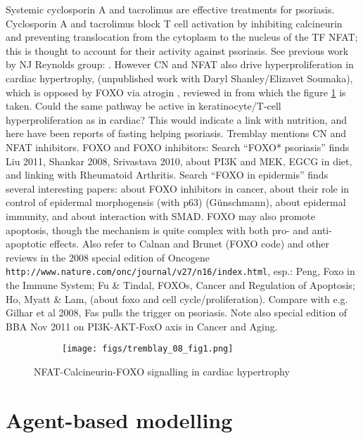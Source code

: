 \documentclass[a4paper,10pt]{report}
\begin{document}
Systemic cyclosporin A and tacrolimus are effective treatments for psoriasis. Cyclosporin A and tacrolimus block T cell activation by inhibiting calcineurin and preventing translocation from the cytoplasm to the nucleus of the TF NFAT; this is thought to account for their activity against psoriasis. See previous work by NJ Reynolds group: \cite{aldaraji2002localization}. However CN and NFAT also drive hyperproliferation in cardiac hypertrophy, (unpublished work with Daryl Shanley/Elizavet Soumaka), which is opposed by FOXO via atrogin \cite{ni2006foxo, ni2007foxo, li2007atrogin}, reviewed in \cite{tremblay2008phosphatases} from which the figure \ref{fig:tremblayfoxonfat} is taken. Could the same pathway be active in keratinocyte/T-cell hyperproliferation as in cardiac? This would indicate a link with nutrition, and here have been reports of fasting helping psoriasis. Tremblay mentions CN and NFAT inhibitors. FOXO and FOXO inhibitors: Search ``FOXO* psoriasis'' finds Liu 2011, Shankar 2008, Srivastava 2010, about PI3K and MEK, EGCG in diet, and linking with Rheumatoid Arthritis. Search ``FOXO in epidermis'' finds several interesting papers: about FOXO inhibitors in cancer, about their role in control of epidermal morphogensis (with p63) (G\"{u}nschmann), about epidermal immunity, and about interaction with SMAD. FOXO may also promote apoptosis, though the mechanism is quite complex with both pro- and anti- apoptotic effects. Also refer to Calnan and Brunet (FOXO code) and other reviews in the 2008 special edition of Oncogene {\tt http://www.nature.com/onc/journal/v27/n16/index.html}, esp.: Peng, Foxo in the Immune System; Fu \& Tindal, FOXOs, Cancer and Regulation of Apoptosis; Ho, Myatt \& Lam, (about foxo and cell cycle/proliferation). Compare with e.g. Gilhar et al 2008, Fas pulls the trigger on psoriasis. 
Note also special edition of BBA Nov 2011 on PI3K-AKT-FoxO axis in Cancer and Aging. 


\begin{figure}[h!]
    \centering  
  \begin{subfigure}{.6\textwidth}
    \texttt{[image: figs/tremblay\_08\_fig1.png]}
  \end{subfigure}
  \caption{NFAT-Calcineurin-FOXO signalling in cardiac hypertrophy \cite{tremblay2008phosphatases}}
  \label{fig:tremblayfoxonfat}
\end{figure}


\chapter{Agent-based modelling}
\end{document}
